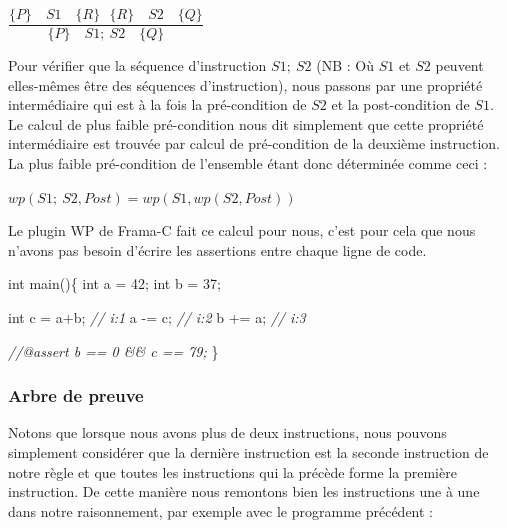 \documentclass[12pt,francais,]{scrbook}
\newenvironment{Shaded}{}{}
\newcommand{\DataTypeTok}[1]{\textcolor[rgb]{0.56,0.13,0.00}{{#1}}}
\newcommand{\DecValTok}[1]{\textcolor[rgb]{0.25,0.63,0.44}{{#1}}}
\newcommand{\CommentTok}[1]{\textcolor[rgb]{0.38,0.63,0.69}{\textit{{#1}}}}
\newcommand{\NormalTok}[1]{{#1}}
\begin{document}
\begin{center}
\(\dfrac{\{P\}\quad S1 \quad \{R\} \ \ \ \{R\}\quad S2 \quad \{Q\}}{\{P\}\quad S1 ;\ S2 \quad \{Q\}}\)
\end{center}

Pour vérifier que la séquence d'instruction \(S1;\ S2\) (NB : Où \(S1\)
et \(S2\) peuvent elles-mêmes être des séquences d'instruction), nous
passons par une propriété intermédiaire qui est à la fois la
pré-condition de \(S2\) et la post-condition de \(S1\). Le calcul de
plus faible pré-condition nous dit simplement que cette propriété
intermédiaire est trouvée par calcul de pré-condition de la deuxième
instruction. La plus faible pré-condition de l'ensemble étant donc
déterminée comme ceci :

\begin{center} \(wp(S1;\ S2 , Post) = wp(S1, wp(S2, Post) )\)
\end{center}

Le plugin WP de Frama-C fait ce calcul pour nous, c'est pour cela que
nous n'avons pas besoin d'écrire les assertions entre chaque ligne de
code.

\begin{footnotesize}\begin{Shaded}
\begin{Highlighting}[]
\DataTypeTok{int} \NormalTok{main()\{}
  \DataTypeTok{int} \NormalTok{a = }\DecValTok{42}\NormalTok{;}
  \DataTypeTok{int} \NormalTok{b = }\DecValTok{37}\NormalTok{;}

  \DataTypeTok{int} \NormalTok{c = a+b; }\CommentTok{// i:1}
  \NormalTok{a -= c;      }\CommentTok{// i:2}
  \NormalTok{b += a;      }\CommentTok{// i:3}

  \CommentTok{//@assert b == 0 && c == 79;}
\NormalTok{\}}
\end{Highlighting}
\end{Shaded}\end{footnotesize}

\subsubsection{Arbre de preuve}\label{arbre-de-preuve}

Notons que lorsque nous avons plus de deux instructions, nous pouvons
simplement considérer que la dernière instruction est la seconde
instruction de notre règle et que toutes les instructions qui la précède
forme la première \og{}instruction\fg{}. De cette manière nous remontons bien
les instructions une à une dans notre raisonnement, par exemple avec le
programme précédent :
\end{document}
